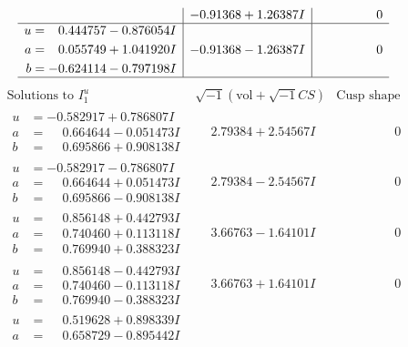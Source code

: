 \documentclass[1p]{elsarticle_modified}
\theoremstyle{definition}
\newcommand{\I}{\sqrt{-1}}
\begin{document}
$$\begin{array}{c|c|c}
 & -0.91368 + 1.26387 I & \phantom{-0.000000 } 0 \\ \hline\begin{aligned}
u &= \phantom{-}0.444757 - 0.876054 I \\
a &= \phantom{-}0.055749 + 1.041920 I \\
b &= -0.624114 - 0.797198 I\end{aligned}
 & -0.91368 - 1.26387 I & \phantom{-0.000000 } 0\\
 \hline 
 \end{array}$$\newpage$$\begin{array}{c|c|c}  
\text{Solutions to }I^u_{1}& \I (\text{vol} + \sqrt{-1}CS) & \text{Cusp shape}\\
 \hline 
\begin{aligned}
u &= -0.582917 + 0.786807 I \\
a &= \phantom{-}0.664644 - 0.051473 I \\
b &= \phantom{-}0.695866 + 0.908138 I\end{aligned}
 & \phantom{-}2.79384 + 2.54567 I & \phantom{-0.000000 } 0 \\ \hline\begin{aligned}
u &= -0.582917 - 0.786807 I \\
a &= \phantom{-}0.664644 + 0.051473 I \\
b &= \phantom{-}0.695866 - 0.908138 I\end{aligned}
 & \phantom{-}2.79384 - 2.54567 I & \phantom{-0.000000 } 0 \\ \hline\begin{aligned}
u &= \phantom{-}0.856148 + 0.442793 I \\
a &= \phantom{-}0.740460 + 0.113118 I \\
b &= \phantom{-}0.769940 + 0.388323 I\end{aligned}
 & \phantom{-}3.66763 - 1.64101 I & \phantom{-0.000000 } 0 \\ \hline\begin{aligned}
u &= \phantom{-}0.856148 - 0.442793 I \\
a &= \phantom{-}0.740460 - 0.113118 I \\
b &= \phantom{-}0.769940 - 0.388323 I\end{aligned}
 & \phantom{-}3.66763 + 1.64101 I & \phantom{-0.000000 } 0 \\ \hline\begin{aligned}
u &= \phantom{-}0.519628 + 0.898339 I \\
a &= \phantom{-}0.658729 - 0.895442 I \\

\end{aligned}
\end{array}$$
\end{document}
